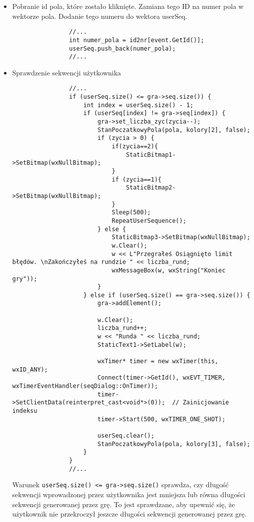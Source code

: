 \documentclass[]{report}
\begin{document}
\begin{itemize}
		\begin{itemize}
			\item Pobranie id pola, które zostało kliknięte. Zamiana tego ID na numer pola w wektorze pola. Dodanie tego numeru do wektora userSeq.
			\begin{lstlisting}
				//...
				int numer_pola = id2nr[event.GetId()];
				userSeq.push_back(numer_pola);
				//...
			\end{lstlisting}
			\item Sprawdzenie sekwencji użytkownika
			\begin{lstlisting}
				//...
				if (userSeq.size() <= gra->seq.size()) {
					int index = userSeq.size() - 1;
					if (userSeq[index] != gra->seq[index]) {
						gra->set_liczba_zyc(zycia--);
						StanPoczatkowyPola(pola, kolory[2], false);
						if (zycia > 0) {
							if(zycia==2){
								StaticBitmap1->SetBitmap(wxNullBitmap);
							}
							if (zycia==1){
								StaticBitmap2->SetBitmap(wxNullBitmap);
							}
							Sleep(500);
							RepeatUserSequence();
						} else {
							StaticBitmap3->SetBitmap(wxNullBitmap);
							w.Clear();
							w << L"Przegrałeś Osiągnięto limit błędów. \nZakończyłeś na rundzie " << liczba_rund;
							wxMessageBox(w, wxString("Koniec gry"));
						}
					} else if (userSeq.size() == gra->seq.size()) {
						gra->addElement();
						
						w.Clear();
						liczba_rund++;
						w << "Runda " << liczba_rund;
						StaticText1->SetLabel(w);
						
						wxTimer* timer = new wxTimer(this, wxID_ANY);
						Connect(timer->GetId(), wxEVT_TIMER, wxTimerEventHandler(seqDialog::OnTimer));
						timer->SetClientData(reinterpret_cast<void*>(0));  // Zainicjowanie indeksu
						timer->Start(500, wxTIMER_ONE_SHOT);
					
						userSeq.clear();
						StanPoczatkowyPola(pola, kolory[3], false);
					}
				}
				//...
			\end{lstlisting}
			Warunek \texttt{userSeq.size() <= gra->seq.size()} sprawdza, czy długość sekwencji wprowadzonej przez użytkownika jest mniejsza lub równa długości sekwencji generowanej przez grę. To jest sprawdzane, aby upewnić się, że użytkownik nie przekroczył jeszcze długości sekwencji generowanej przez grę.
			

\end{itemize}
\end{itemize}
\end{document}
